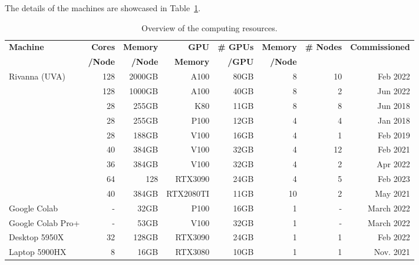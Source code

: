 \documentclass[utf8]{FrontiersinVancouver} %
\begin{document}
The details of the machines are showcased in Table~\ref{tab:hwoverview}.

\begin{table}[htb]
    \caption{Overview of the computing resources.}
    \label{tab:hwoverview}
    \begin{center}
    {\footnotesize
    \begin{tabular}{|l|r|r|r|r|r|r|r|}
        \hline
            {\bf Machine}  & {\bf Cores} & {\bf Memory} & {\bf GPU}   &   {\bf \# GPUs} & {\bf Memory} & {\bf \# Nodes}  & {\bf Commissioned} \\ 
                     &  {\bf /Node} & {\bf /Node}  &  {\bf Memory} & {\bf /GPU}     &   {\bf /Node}        & & \\
        \hline
        \hline
        Rivanna (UVA)    & 128 & 2000GB   & A100 & 80GB &  8  & 10 & Feb 2022 \\
                        & 128 & 1000GB   & A100 & 40GB &  8  &  2 & Jun 2022  \\   
                        & 28  & 255GB    & K80  & 11GB &  8  &  8 & Jun 2018         \\
                        & 28  & 255GB    & P100 & 12GB &  4  &  4 & Jan 2018         \\
                        & 28  & 188GB    & V100 & 16GB &  4  &  1 & Feb 2019          \\
                        & 40  & 384GB    & V100 & 32GB &  4  & 12 & Feb 2021          \\
                        & 36  & 384GB    & V100 & 32GB &  4  &  2 & Apr 2022          \\
                        &  64 & 128     & RTX3090   & 24GB    & 4   &  5 & Feb 2023         \\
                        & 40  & 384GB    & RTX2080TI & 11GB & 10  &  2 & May 2021 \\                        
         \hline
         Google Colab      & -   & 32GB      & P100      & 16GB    & 1 & - & March 2022 \\
         Google Colab Pro+ & -   & 53GB      & V100      & 32GB    & 1 & - & March 2022 \\
         \hline
         Desktop 5950X     &  32 & 128GB     & RTX3090   & 24GB    & 1 & 1 & Feb 2022   \\
         \hline
         Laptop 5900HX     &   8 & 16GB      & RTX3080   & 10GB    & 1 & 1 & Nov. 2021 \\
         \hline
    \end{tabular}
    }
    \end{center}


\end{table}
\end{document}
